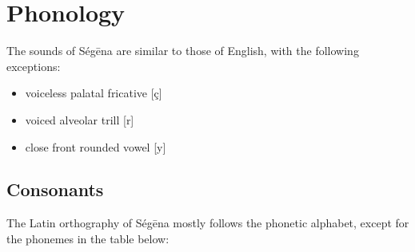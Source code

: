 \chapter{Phonology}

The sounds of Ségēna are similar to those of English, with the following
exceptions:

\begin{itemize}
	\item voiceless palatal fricative [ç]
	\item voiced alveolar trill [r]
	\item close front rounded vowel [y]
\end{itemize}

\section{Consonants}


The Latin orthography of Ségēna mostly follows the phonetic alphabet, except for
the phonemes in the table below:


